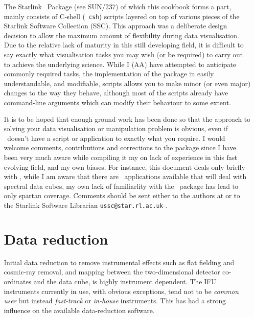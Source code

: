 \documentclass[twoside,11pt]{article}
\newcommand{\htmladdnormallink}[2]{#1}
\newenvironment{latexonly}{}{}
\newcommand{\xref}[3]{#1}
\newcommand{\xlabel}[1]{}
\begin{document}
The \htmladdnormallink{Starlink}{http://www.starlink.ac.uk/} 
\DATACUBEref\ Package 
\begin{latexonly}
(see SUN/237)
\end{latexonly}
of which this cookbook forms a part, mainly consists of C-shell ({\tt
csh}) scripts layered on top of various pieces of the Starlink
Software Collection (SSC).  This approach was a deliberate design
decision to allow the maximum amount of flexibility during data
visualisation.  Due to the relative lack of maturity in this still
developing field, it is difficult to say exactly what visualisation
tasks you may wish (or be required) to carry out to achieve the
underlying science.  While I (AA) have attempted to anticipate commonly
required tasks, the implementation of the package in easily
understandable, and modifiable, scripts allows you to make minor (or
even major) changes to the way they behave, although most of the
scripts already have \xref{command-line arguments}{sun237}{} which
can modify their behaviour to some extent\latexonly{ (see SUN/237 for
details)}.

It is to be hoped that enough ground work has been done so that the
approach to solving your data visualisation or manipulation problem is
obvious, even if \DATACUBE\ doesn't have a script or application to
exactly what you require.  I would welcome comments, contributions and
corrections to the package since I have been very much aware while
compiling it my on lack of experience in this fast evolving field, and
my own biases.  For instance, this document deals only briefly with
\IRAFref, while I am aware that there are \IRAF\ applications
available that will deal with spectral data cubes, my own lack of
familiarlity with the \IRAF\ package has lead to only spartan
coverage.  Comments should be sent either to the authors at or to
the Starlink Software Librarian
\htmladdnormallink{{\tt ussc@star.rl.ac.uk} }{mailto:ussc@star.rl.ac.uk}.

\section{\xlabel{sc16_reduction}Data reduction\label{sc16_reduction}}

Initial data reduction to remove instrumental effects such as flat
fielding and cosmic-ray removal, and mapping between the
two-dimensional detector co-ordinates and the data cube, is highly
instrument dependent.  The IFU instruments currently in use, with
obvious exceptions, tend not to be {\em common user} but instead {\em
fast-track} or {\em in-house} instruments.  This has had a strong
influence on the available data-reduction software.
\end{document}
